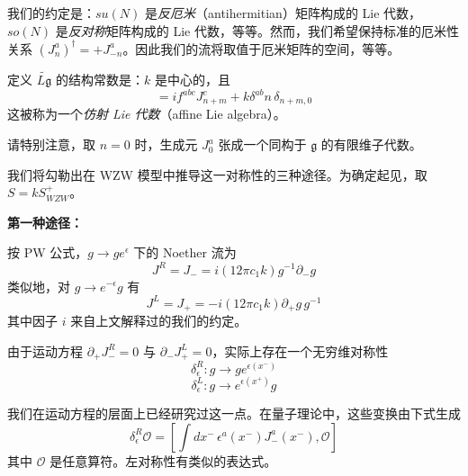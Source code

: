 我们的约定是：$su(N)$ 是\emph{反厄米}（antihermitian）矩阵构成的 Lie 代数，$so(N)$ 是\emph{反对称}矩阵构成的 Lie 代数，等等。然而，我们希望保持标准的厄米性关系 $(J^a_n)^\dagger=+J^a_{-n}$。因此我们的流将取值于厄米矩阵的空间，等等。

定义 $\widetilde{L\mathfrak{g}}$ 的结构常数是：$k$ 是中心的，且
\begin{equation}
  [J^a_n, J^b_m] = i f^{abc}J^c_{n+m} + k\delta^{ab}n\,\delta_{n+m,0}
  \tag{4.52}
  \label{eq:4.52}
\end{equation}
这被称为一个\emph{仿射 Lie 代数}（affine Lie algebra）。

请特别注意，取 $n=0$ 时，生成元 $J^a_0$ 张成一个同构于 $\mathfrak{g}$ 的有限维子代数。

我们将勾勒出在 WZW 模型中推导这一对称性的三种途径。为确定起见，取 $S=kS^+_{WZW}$。

\textbf{第一种途径：}

按 PW 公式，$g\to ge^{\epsilon}$ 下的 Noether 流为
\begin{equation}
  J^R = J_- = i(12\pi c_1 k)g^{-1}\partial_- g
  \tag{4.53}
  \label{eq:4.53}
\end{equation}
类似地，对 $g\to e^{-\epsilon}g$ 有
\begin{equation}
  J^L = J_+ = -i(12\pi c_1 k)\partial_+ g\,g^{-1}
  \tag{4.54}
  \label{eq:4.54}
\end{equation}
其中因子 $i$ 来自上文解释过的我们的约定。

由于运动方程 $\partial_+J^R_-=0$ 与 $\partial_-J^L_+=0$，实际上存在一个无穷维对称性
\begin{equation}
  \delta^R_\epsilon : g\to ge^{\epsilon(x^-)}
  \tag{4.55}
  \label{eq:4.55}
\end{equation}
\begin{equation}
  \delta^L_\epsilon : g\to e^{\epsilon(x^+)}g
  \tag{4.56}
  \label{eq:4.56}
\end{equation}

我们在运动方程的层面上已经研究过这一点。在量子理论中，这些变换由下式生成
\begin{equation}
  \delta^R_\epsilon\mathcal{O} = \left[\int dx^-\,\epsilon^a(x^-)J^a_-(x^-), \mathcal{O}\right]
  \tag{4.57}
  \label{eq:4.57}
\end{equation}
其中 $\mathcal{O}$ 是任意算符。左对称性有类似的表达式。

